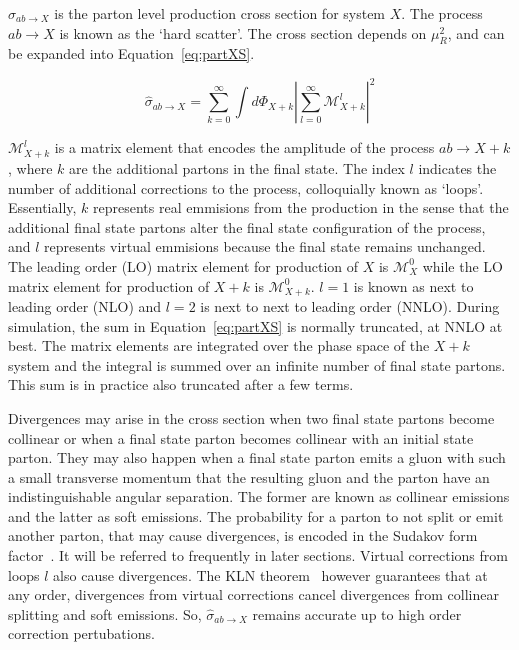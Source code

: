 $\sigma_{ab\to X}$ is the parton level production cross section for system $X$. 
The process $ab\to X$ is known as the `hard scatter'. The cross section depends on 
$\mu_R^2$, and can be expanded into Equation~\ref{eq:partXS}.

\begin{equation}
\hat{\sigma}_{ab\to X} = \sum_{k=0}^{\infty}\int d\Phi_{X+k}|\sum_{l=0}^{\infty}\mathcal{M}_{X+k}^l|^2
\label{eq:partXS}
\end{equation}

$\mathcal{M}_{X+k}^l$ is a matrix element that encodes the amplitude of the process $ab\to X+k$, where $k$ 
are the additional partons in the final state. The index $l$ indicates the number of additional 
corrections to the process, colloquially known as `loops'. Essentially, $k$ represents real emmisions from 
the production in the sense that the additional final state partons alter the final state configuration of the 
process, and $l$ represents 
virtual emmisions because the final state remains unchanged. The leading order (LO) matrix element for production of $X$
is $\mathcal{M}_X^0$ while the LO matrix element for production of $X+k$ is $\mathcal{M}_{X+k}^0$. $l=1$ is 
known as next to leading order (NLO) and $l=2$ is next to next to leading order (NNLO). During simulation, the sum in 
Equation~\ref{eq:partXS} is normally truncated, at NNLO at best. The matrix elements are integrated over the phase 
space of the $X+k$ system and the integral is summed over an infinite number of final state partons. This sum is
in practice also truncated after a few terms. 

\par Divergences may arise in the cross section when two final state partons become collinear or when a final state 
parton becomes collinear with an initial state parton. They may also happen when a final state parton emits a gluon 
with such a small transverse momentum that the resulting gluon and the parton have an indistinguishable angular separation. 
The former are known as collinear emissions and the latter as soft emissions. The probability for a parton to not split or 
emit another parton, that may cause divergences, is encoded in the Sudakov form factor~\cite{Collins:1989bt}. It will be referred to 
frequently in later sections.
Virtual corrections from loops $l$ also cause divergences. The KLN theorem~\cite{Grandou:1994rz} however guarantees that at any order, 
divergences from virtual corrections cancel divergences from collinear splitting and soft emissions. So,
 $\hat{\sigma}_{ab\to X}$ remains accurate up to high order correction pertubations.   

